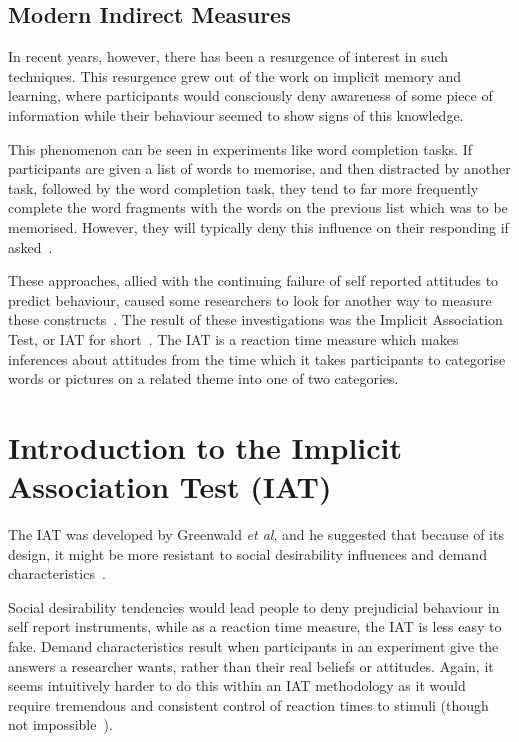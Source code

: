 \subsection{Modern Indirect Measures}
\label{sec:turn-back-indirect}
In recent years, however, there has been a resurgence of interest in such techniques. This resurgence grew out of the work on implicit memory and learning, where participants would consciously deny awareness of some piece of information while their behaviour seemed to show signs of this knowledge.  

This phenomenon can be seen in  experiments like word completion tasks. If participants are given a list of words to memorise, and then distracted by another task, followed by the word completion task, they tend to far more frequently complete the word fragments with the words on the previous list which was to be memorised.  However, they will typically deny this influence on their responding if asked~\cite{Wittenbrink2007a}. 

These approaches, allied with the continuing failure of self reported attitudes to predict behaviour, caused some researchers to look for another way to measure these constructs~\cite{Greenwald1995a}. The result of these investigations was the Implicit Association Test, or IAT for short~\cite{Greenwald1998}. The IAT is a reaction time measure which makes inferences about attitudes from the time which it takes participants to categorise words or pictures on a related theme into one of two categories. 

\section{Introduction to the Implicit Association Test (IAT)}
\label{sec:intr-impl-assoc}

The IAT was developed by Greenwald \textit{et al}, and he suggested that because of its design, it might be more resistant to social desirability influences and demand characteristics~\cite{Greenwald1998}. 

Social desirability tendencies would lead people to deny prejudicial behaviour in self report instruments, while as a reaction time measure, the IAT is less easy to fake. Demand characteristics result when participants in an experiment give the answers a researcher wants, rather than their real beliefs or attitudes. Again, it seems intuitively harder to do this within an IAT methodology as it would require tremendous and consistent control of reaction times to stimuli (though not impossible~\cite{DeHouwer2007b}). 

